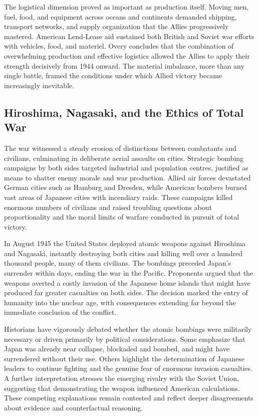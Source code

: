 The logistical dimension proved as important as production itself. Moving men, fuel, food, and equipment across oceans and continents demanded shipping, transport networks, and supply organization that the Allies progressively mastered. American Lend-Lease aid sustained both British and Soviet war efforts with vehicles, food, and materiel. Overy concludes that the combination of overwhelming production and effective logistics allowed the Allies to apply their strength decisively from 1944 onward. The material imbalance, more than any single battle, framed the conditions under which Allied victory became increasingly inevitable. \cite{overy1995} \cite{tooze2006} \cite{weinberg1994}

\subsection{Hiroshima, Nagasaki, and the Ethics of Total War}
The war witnessed a steady erosion of distinctions between combatants and civilians, culminating in deliberate aerial assaults on cities. Strategic bombing campaigns by both sides targeted industrial and population centres, justified as means to shatter enemy morale and war production. Allied air forces devastated German cities such as Hamburg and Dresden, while American bombers burned vast areas of Japanese cities with incendiary raids. These campaigns killed enormous numbers of civilians and raised troubling questions about proportionality and the moral limits of warfare conducted in pursuit of total victory.

In August 1945 the United States deployed atomic weapons against Hiroshima and Nagasaki, instantly destroying both cities and killing well over a hundred thousand people, many of them civilians. The bombings preceded Japan's surrender within days, ending the war in the Pacific. Proponents argued that the weapons averted a costly invasion of the Japanese home islands that might have produced far greater casualties on both sides. The decision marked the entry of humanity into the nuclear age, with consequences extending far beyond the immediate conclusion of the conflict.

Historians have vigorously debated whether the atomic bombings were militarily necessary or driven primarily by political considerations. Some emphasize that Japan was already near collapse, blockaded and bombed, and might have surrendered without their use. Others highlight the determination of Japanese leaders to continue fighting and the genuine fear of enormous invasion casualties. A further interpretation stresses the emerging rivalry with the Soviet Union, suggesting that demonstrating the weapon influenced American calculations. These competing explanations remain contested and reflect deeper disagreements about evidence and counterfactual reasoning.

